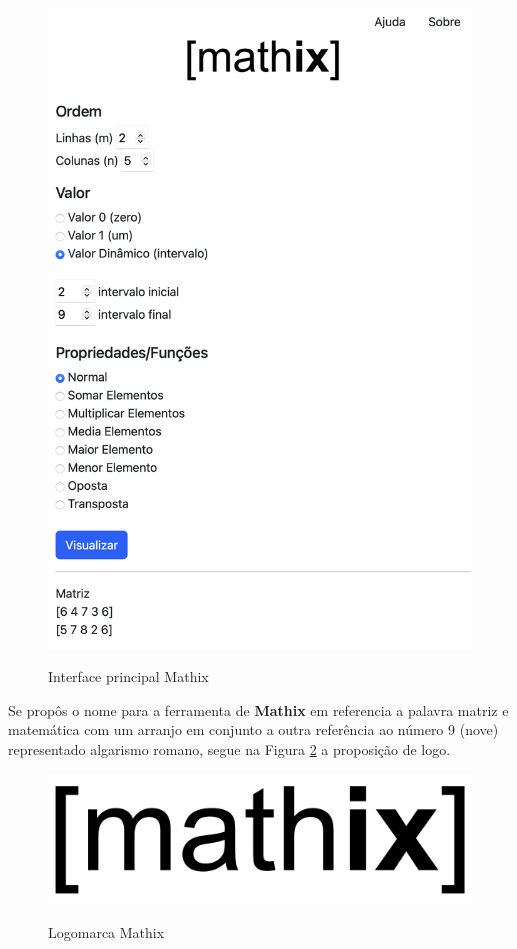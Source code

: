 \begin{figure}[h!]
    \caption{Interface principal Mathix}
    \centering
    \includegraphics[scale=0.4]{figuras/mathix-home.png}
    \label{fig:home_mathix}
\end{figure}

Se propôs o nome para a ferramenta de \textbf{Mathix} em referencia a palavra matriz e matemática com um arranjo em conjunto a outra referência ao número 9 (nove) representado algarismo romano, segue na Figura \ref{fig:logo_mathix} a proposição de logo.

\begin{figure}[h!]
    \caption{Logomarca Mathix}
    \centering
    \includegraphics[scale=0.4]{figuras/mathix_logo.png}
    \label{fig:logo_mathix}
\end{figure}

